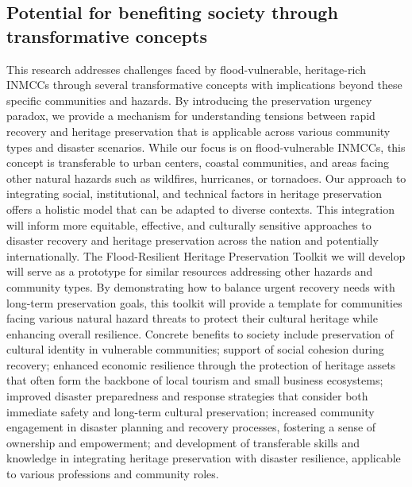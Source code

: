\documentclass[11pt]{article}
\begin{document}
\subsection{Potential for benefiting society through transformative concepts}
\vspace{-0.5cm}
This research addresses challenges faced by flood-vulnerable, heritage-rich INMCCs through several transformative concepts with implications beyond these specific communities and hazards. 
By introducing the preservation urgency paradox, we provide a mechanism for understanding tensions between rapid recovery and heritage preservation that is applicable across various community types and disaster scenarios. 
While our focus is on flood-vulnerable INMCCs, this concept is transferable to urban centers, coastal communities, and areas facing other natural hazards such as wildfires, hurricanes, or tornadoes.
Our approach to integrating social, institutional, and technical factors in heritage preservation offers a holistic model that can be adapted to diverse contexts. 
This integration will inform more equitable, effective, and culturally sensitive approaches to disaster recovery and heritage preservation across the nation and potentially internationally.
The Flood-Resilient Heritage Preservation Toolkit we will develop will serve as a prototype for similar resources addressing other hazards and community types. 
By demonstrating how to balance urgent recovery needs with long-term preservation goals, this toolkit will provide a template for communities facing various natural hazard threats to protect their cultural heritage while enhancing overall resilience. 
Concrete benefits to society include preservation of cultural identity in vulnerable communities;
support of social cohesion during recovery; enhanced economic resilience through the protection of heritage assets that often form the backbone of local tourism and small business ecosystems; improved disaster preparedness and response strategies that consider both immediate safety and long-term cultural preservation; increased community engagement in disaster planning and recovery processes, fostering a sense of ownership and empowerment; and development of transferable skills and knowledge in integrating heritage preservation with disaster resilience, applicable to various professions and community roles.


\vspace{-15pt}
\end{document}
